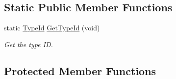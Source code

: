 \subsection*{Static Public Member Functions}
\begin{DoxyCompactItemize}
\item 
static \hyperlink{classns3_1_1TypeId}{Type\+Id} \hyperlink{classns3_1_1BridgeNetDevice_a9c8adb9ce413618caaa052929b69a6c9}{Get\+Type\+Id} (void)
\begin{DoxyCompactList}\small\item\em Get the type ID. \end{DoxyCompactList}\end{DoxyCompactItemize}
\subsection*{Protected Member Functions}
